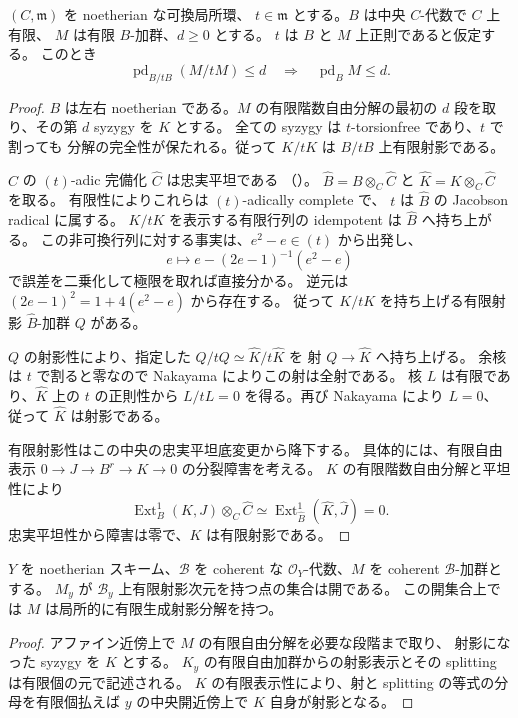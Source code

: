 \begin{lemma}[中心的な一変数に沿う射影次元の持上げ]
\label{cmo:lem:projective-lift}
$(C,\mathfrak m)$ を noetherian な可換局所環、
$t\in\mathfrak m$ とする。$B$ は中央 $C$-代数で $C$ 上有限、
$M$ は有限 $B$-加群、$d\ge0$ とする。
$t$ は $B$ と $M$ 上正則であると仮定する。
このとき
\[
 \operatorname{pd}_{B/tB}(M/tM)\le d
 \quad\Longrightarrow\quad
 \operatorname{pd}_B M\le d.
\]
\end{lemma}
\begin{proof}
$B$ は左右 noetherian である。$M$ の有限階数自由分解の最初の
$d$ 段を取り、その第 $d$ syzygy を $K$ とする。
全ての syzygy は $t$-torsionfree であり、$t$ で割っても
分解の完全性が保たれる。従って $K/tK$ は $B/tB$ 上有限射影である。

$C$ の $(t)$-adic 完備化 $\widehat C$ は忠実平坦である
（\cite[Tag~00MC]{CMOStacksCompletion}）。
$\widehat B=B\otimes_C\widehat C$ と
$\widehat K=K\otimes_C\widehat C$ を取る。
有限性によりこれらは $(t)$-adically complete で、
$t$ は $\widehat B$ の Jacobson radical に属する。
$K/tK$ を表示する有限行列の idempotent は $\widehat B$ へ持ち上がる。
この非可換行列に対する事実は、$e^2-e\in(t)$ から出発し、
\[
 e\longmapsto e-(2e-1)^{-1}(e^2-e)
\]
で誤差を二乗化して極限を取れば直接分かる。
逆元は $(2e-1)^2=1+4(e^2-e)$ から存在する。
従って $K/tK$ を持ち上げる有限射影 $\widehat B$-加群 $Q$ がある。

$Q$ の射影性により、指定した $Q/tQ\simeq\widehat K/t\widehat K$ を
射 $Q\to\widehat K$ へ持ち上げる。
余核は $t$ で割ると零なので Nakayama によりこの射は全射である。
核 $L$ は有限であり、$\widehat K$ 上の $t$ の正則性から
$L/tL=0$ を得る。再び Nakayama により $L=0$、
従って $\widehat K$ は射影である。

有限射影性はこの中央の忠実平坦底変更から降下する。
具体的には、有限自由表示 $0\to J\to B^r\to K\to0$ の分裂障害を考える。
$K$ の有限階数自由分解と平坦性により
\[
 \operatorname{Ext}^1_B(K,J)\otimes_C\widehat C
 \simeq
 \operatorname{Ext}^1_{\widehat B}(\widehat K,\widehat J)=0.
\]
忠実平坦性から障害は零で、$K$ は有限射影である。
\end{proof}

\begin{lemma}
\label{cmo:lem:perfect-locus}
$Y$ を noetherian スキーム、$\mathcal B$ を coherent な
$\mathcal O_Y$-代数、$M$ を coherent $\mathcal B$-加群とする。
$M_y$ が $\mathcal B_y$ 上有限射影次元を持つ点の集合は開である。
この開集合上では $M$ は局所的に有限生成射影分解を持つ。
\end{lemma}
\begin{proof}
アファイン近傍上で $M$ の有限自由分解を必要な段階まで取り、
射影になった syzygy を $K$ とする。
$K_y$ の有限自由加群からの射影表示とその splitting は有限個の元で記述される。
$K$ の有限表示性により、射と splitting の等式の分母を有限個払えば
$y$ の中央開近傍上で $K$ 自身が射影となる。
\end{proof}

